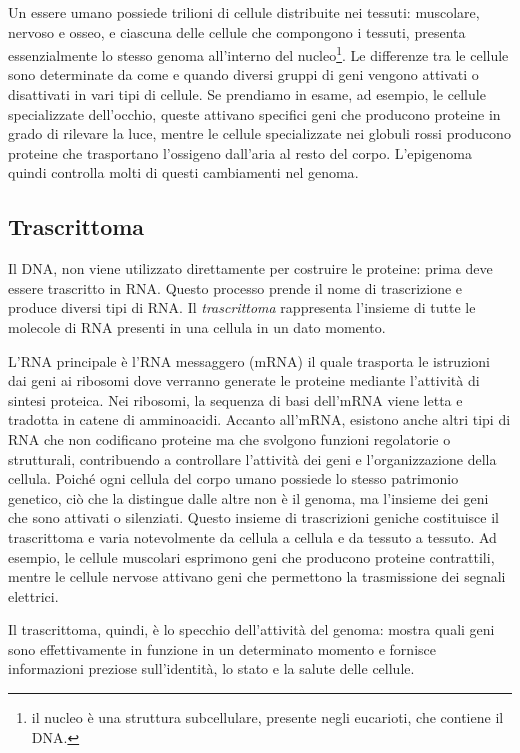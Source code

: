 Un essere umano possiede trilioni
di cellule distribuite nei tessuti: muscolare, nervoso e
osseo, e ciascuna delle cellule che compongono i tessuti,
presenta essenzialmente lo stesso genoma all'interno del
nucleo\footnote{il nucleo è una struttura subcellulare, presente negli
eucarioti, che contiene il DNA.}.
Le differenze tra le cellule sono determinate da come e quando diversi gruppi di geni vengono attivati 
o disattivati in vari tipi di cellule. Se prendiamo in esame, ad esempio, 
le cellule specializzate dell'occhio, queste attivano
speciﬁci geni che producono 
proteine in grado di rilevare la luce, mentre le cellule specializzate nei 
globuli rossi producono proteine che trasportano l'ossigeno dall'aria al resto del corpo. 
L'epigenoma quindi controlla molti di questi cambiamenti nel genoma\cite{genomeGov}.

\subsection{Trascrittoma}\label{subsec:trascrittomi}
Il DNA, non viene utilizzato direttamente per costruire le proteine: prima deve essere trascritto in RNA. 
Questo processo prende il nome di trascrizione e produce diversi tipi di RNA.
Il \textit{trascrittoma} rappresenta l'insieme di tutte le molecole di RNA presenti in una cellula in un dato momento.

L'RNA principale è l'RNA messaggero (mRNA) il quale trasporta le istruzioni dai
geni ai ribosomi dove verranno generate le proteine
mediante l'attività di sintesi proteica. Nei ribosomi, 
la sequenza di basi dell'mRNA viene letta e tradotta in catene di amminoacidi.
Accanto all'mRNA, esistono anche altri tipi di RNA che non codificano proteine ma che svolgono funzioni regolatorie 
o strutturali, contribuendo a controllare l'attività dei geni e l'organizzazione della cellula.
Poiché ogni cellula del corpo umano possiede lo stesso patrimonio genetico, 
ciò che la distingue dalle altre non è il genoma, ma l'insieme dei geni che sono attivati o silenziati. 
Questo insieme di trascrizioni geniche costituisce il trascrittoma e varia notevolmente da cellula a cellula 
e da tessuto a tessuto. Ad esempio, le cellule muscolari esprimono geni che producono proteine contrattili, 
mentre le cellule nervose attivano geni che permettono la trasmissione dei segnali elettrici.

Il trascrittoma, quindi, è lo specchio dell'attività del genoma: mostra quali geni sono effettivamente 
in funzione in un determinato momento e fornisce informazioni preziose sull'identità, 
lo stato e la salute delle cellule\cite{genomeGov}.

